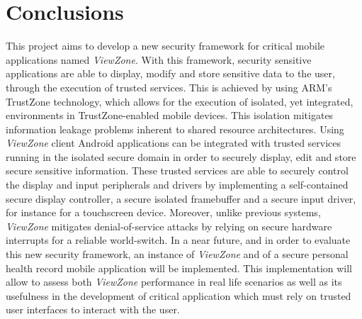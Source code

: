 
% 
% 

\section{Conclusions}
\label{sec:conclusion}

This project aims to develop a new security framework for critical mobile applications named \emph{ViewZone}. With this framework, security sensitive applications are able to display, modify and store sensitive data to the user, through the execution of trusted services. This is achieved by using ARM's TrustZone technology, which allows for the execution of isolated, yet integrated, environments in TrustZone-enabled mobile devices. This isolation mitigates information leakage problems inherent to shared resource architectures. Using \emph{ViewZone} client Android applications can be integrated with trusted services running in the isolated secure domain in order to securely display, edit and store secure sensitive information. These trusted services are able to securely control the display and input peripherals and drivers by implementing a self-contained secure display controller, a secure isolated framebuffer and a secure input driver, for instance for a touchscreen device. Moreover, unlike previous systems, \emph{ViewZone} mitigates denial-of-service attacks by relying on secure hardware interrupts for a reliable world-switch. In a near future, and in order to evaluate this new security framework, an instance of \emph{ViewZone} and of a secure personal health record mobile application will be implemented. This implementation will allow to assess both \emph{ViewZone} performance in real life scenarios as well as its usefulness in the
development of critical application which must rely on trusted user interfaces to interact with the user.